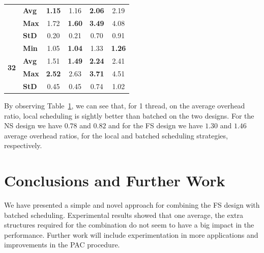 \documentclass{llncs}
\begin{document}
\begin{table}[!ht]
\begin{tabular}{ll|cc|cc}
& {\bf Avg }& {\bf 1.15}& 1.16& {\bf 2.06}& 2.19\\
& {\bf Max }& 1.72& {\bf 1.60}& {\bf 3.49}& 4.08\\
& {\bf StD }& 0.20& 0.21& 0.70& 0.91\\
\hline
\multirow{4}{*}{\bf 32}
& {\bf Min }& 1.05& {\bf 1.04}& 1.33& {\bf 1.26}\\
& {\bf Avg }& 1.51& {\bf 1.49}& {\bf 2.24}& 2.41\\
& {\bf Max }& {\bf 2.52}& 2.63& {\bf 3.71}& 4.51\\
& {\bf StD }& 0.45& 0.45& 0.74& 1.02\\
\hline\hline
\end{tabular}%
\label{tab_batched_overhead}
\vspace{-0.7\intextsep}
\end{table}

By observing Table~\ref{tab_batched_overhead}, we can see that, for 1
thread, on the average overhead ratio, local scheduling is sightly
better than batched on the two designs. For the NS design we have
$0.78$ and $0.82$ and for the FS design we have $1.30$ and $1.46$
average overhead ratios, for the local and batched scheduling
strategies, respectively.


\section{Conclusions and Further Work}
We have presented a simple and novel approach for combining the FS
design with batched scheduling. Experimental results showed that one
average, the extra structures required for the combination do not seem
to have a big impact in the performance. Further work will include
experimentation in more applications and improvements in the PAC
procedure.







\end{document}
